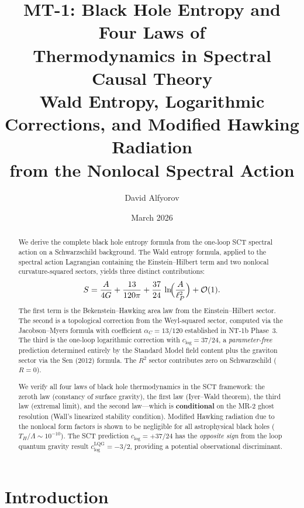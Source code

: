 \documentclass[11pt,a4paper]{article}
\title{MT-1: Black Hole Entropy and Four Laws of\\
Thermodynamics in Spectral Causal Theory\\[6pt]
\large Wald Entropy, Logarithmic Corrections, and Modified Hawking Radiation\\
from the Nonlocal Spectral Action}
\author{David Alfyorov}
\date{March 2026}
\theoremstyle{plain}
\theoremstyle{definition}
\begin{document}
\maketitle

\begin{center}
\end{center}

\begin{abstract}
We derive the complete black hole entropy formula from the
one-loop SCT spectral action on a Schwarzschild background.
The Wald entropy formula, applied to the spectral action
Lagrangian containing the Einstein--Hilbert term and two
nonlocal curvature-squared sectors, yields three distinct
contributions:
\begin{equation*}
  S = \frac{A}{4G} + \frac{13}{120\pi}
  + \frac{37}{24}\,\ln\!\Bigl(\frac{A}{\ell_P^2}\Bigr) + \mathcal{O}(1).
\end{equation*}
The first term is the Bekenstein--Hawking area law from the
Einstein--Hilbert sector.  The second is a topological
correction from the Weyl-squared sector, computed via the
Jacobson--Myers formula with coefficient
$\alpha_C = 13/120$ established in NT-1b Phase~3.  The third
is the one-loop logarithmic correction with
$c_{\log} = 37/24$, a \emph{parameter-free} prediction
determined entirely by the Standard Model field content plus
the graviton sector via the Sen (2012) formula.  The $R^2$
sector contributes zero on Schwarzschild ($R = 0$).

We verify all four laws of black hole thermodynamics in the
SCT framework: the zeroth law (constancy of surface gravity),
the first law (Iyer--Wald theorem), the third law (extremal
limit), and the second law---which is \textbf{conditional}
on the MR-2 ghost resolution (Wall's linearized stability
condition).  Modified Hawking radiation due to the nonlocal
form factors is shown to be negligible for all astrophysical
black holes ($T_H/\Lambda \sim 10^{-10}$).  The SCT
prediction $c_{\log} = +37/24$ has the \emph{opposite sign}
from the loop quantum gravity result
$c_{\log}^{\mathrm{LQG}} = -3/2$, providing a potential
observational discriminant.
\end{abstract}

\tableofcontents

\section{Introduction}\label{sec:intro}
\end{document}
